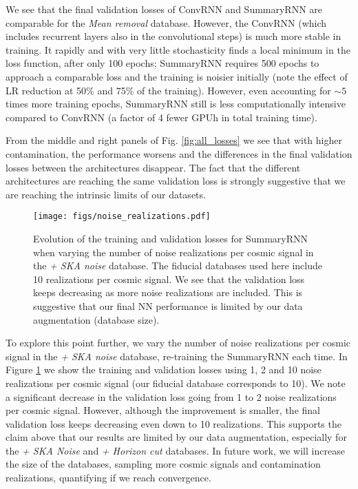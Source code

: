 \documentclass[fleqn,usenatbib]{mnras}
\begin{document}
We see that the final validation losses of ConvRNN and SummaryRNN are comparable for the {\it Mean removal} database.  However, the ConvRNN (which includes recurrent layers also in the convolutional steps) is much more stable in training.  It rapidly and with very little stochasticity finds a local minimum in the loss function,
after only 100 epochs; SummaryRNN requires 500 epochs to approach a comparable loss and the training is noisier initially (note the effect of LR reduction at 50\% and 75\% of the training).  However, even accounting for $\sim5$ times more training epochs, SummaryRNN still is less computationally intensive compared to ConvRNN (a factor of 4 fewer GPUh in total training time).

From the middle and right panels of Fig. \ref{fig:all_losses} we see that with higher contamination, the performance worsens and the differences in the final validation losses between the architectures disappear.  The fact that the different architectures are reaching the same validation loss is strongly suggestive that we are reaching the intrinsic limits of our datasets.

\begin{figure}
    \centering
        \texttt{[image: figs/noise\_realizations.pdf]}
        \caption{Evolution of the training and validation losses for SummaryRNN when varying the number of noise realizations per cosmic signal in the {\it + SKA noise} database.  The fiducial databases used here include 10 realizations per cosmic signal.  We see that the validation loss keeps decreasing as more noise realizations are included.  This is suggestive that our final NN performance is limited by our data augmentation (database size).}
        \label{fig:noise_augmentation}
\end{figure}

To explore this point further, we vary the number of noise realizations per cosmic signal in the {\it + SKA noise} database, re-training the SummaryRNN each time.  In Figure \ref{fig:noise_augmentation} we show the training and validation losses using 1, 2 and 10 noise realizations per cosmic signal (our fiducial database corresponds to 10).  We note a significant decrease in the validation loss going from 1 to 2 noise realizations per cosmic signal.  However, although the improvement is smaller, the final validation loss keeps decreasing even down to 10 realizations.  This supports the claim above that our results are limited by our data augmentation, especially for the {\it + SKA Noise} and {\it + Horizon cut} databases.  In future work, we will increase the size of the databases, sampling more cosmic signals and contamination realizations, quantifying if we reach convergence.
\end{document}
